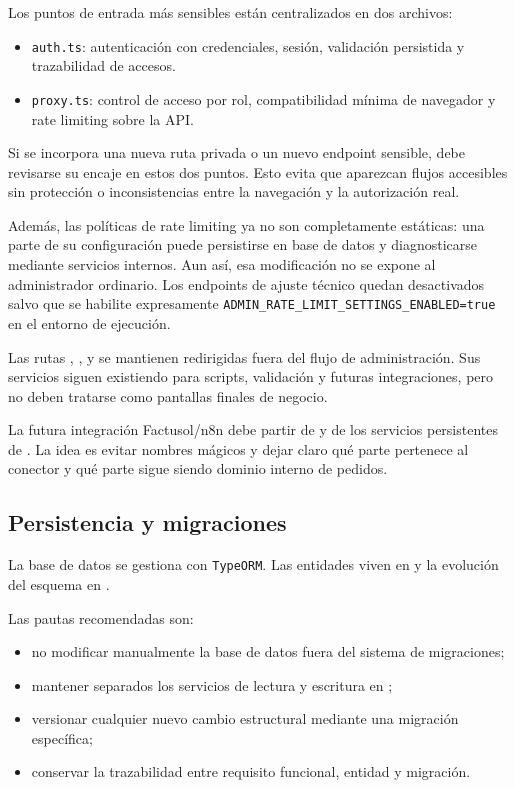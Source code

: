 Los puntos de entrada más sensibles están centralizados en dos archivos:

\begin{itemize}
    \item \texttt{auth.ts}: autenticación con credenciales, sesión, validación persistida y trazabilidad de accesos.
    \item \texttt{proxy.ts}: control de acceso por rol, compatibilidad mínima de navegador y rate limiting sobre la API.
\end{itemize}

Si se incorpora una nueva ruta privada o un nuevo endpoint sensible, debe revisarse su encaje en estos dos puntos. Esto evita que aparezcan flujos accesibles sin protección o inconsistencias entre la navegación y la autorización real.

Además, las políticas de rate limiting ya no son completamente estáticas: una parte de su configuración puede persistirse en base de datos y diagnosticarse mediante servicios internos. Aun así, esa modificación no se expone al administrador ordinario. Los endpoints de ajuste técnico quedan desactivados salvo que se habilite expresamente \texttt{ADMIN\_RATE\_LIMIT\_SETTINGS\_ENABLED=true} en el entorno de ejecución.

Las rutas , ,  y  se mantienen redirigidas fuera del flujo de administración. Sus servicios siguen existiendo para scripts, validación y futuras integraciones, pero no deben tratarse como pantallas finales de negocio.

La futura integración Factusol/n8n debe partir de  y de los servicios persistentes de . La idea es evitar nombres mágicos y dejar claro qué parte pertenece al conector y qué parte sigue siendo dominio interno de pedidos.

\subsection{Persistencia y migraciones}

La base de datos se gestiona con \texttt{TypeORM}. Las entidades viven en  y la evolución del esquema en .

Las pautas recomendadas son:

\begin{itemize}
    \item no modificar manualmente la base de datos fuera del sistema de migraciones;
    \item mantener separados los servicios de lectura y escritura en ;
    \item versionar cualquier nuevo cambio estructural mediante una migración específica;
    \item conservar la trazabilidad entre requisito funcional, entidad y migración.
\end{itemize}

